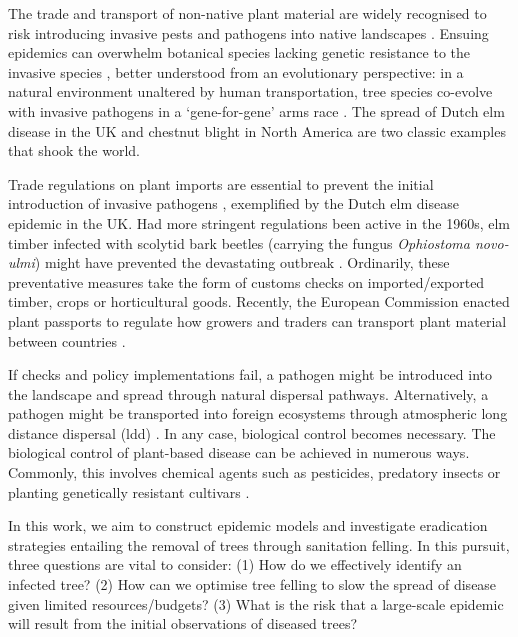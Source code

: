 The trade and transport of non-native plant material are widely recognised to risk introducing invasive pests and pathogens into native landscapes \cite{POTTER201761, lovett2016nonnative, roy2014increasing}.
Ensuing epidemics can overwhelm botanical species lacking genetic resistance to the invasive species \cite{desprez2016evolutionary}, better understood from an evolutionary perspective: in a natural environment unaltered by human transportation, tree species co-evolve with invasive pathogens in a `gene-for-gene' arms race \cite{Thrall1735, dangl2001plant, flor1971current}.
The spread of Dutch elm disease in the UK \cite{doi:10.1111/j.1365-3059.2010.02391.x} and chestnut blight
in North America \cite{doi:10.1002/9780470535486.ch7} are two classic examples that shook the world.

Trade regulations on plant imports are essential to prevent the initial introduction of invasive pathogens \cite{rodoni2009role}, exemplified by the Dutch elm disease epidemic in the UK. 
Had more stringent regulations been active in the 1960s, elm timber infected with scolytid bark beetles (carrying the fungus \textit{Ophiostoma novo‐ulmi}) might have prevented the devastating outbreak \cite{doi:10.1111/j.1365-3059.2010.02391.x}. 
Ordinarily, these preventative measures take the form of customs checks on imported/exported timber, crops or horticultural goods. 
Recently, the European Commission enacted plant passports to regulate how growers and traders can transport plant material between countries \cite{wulfert2010implementation}.

If checks and policy implementations fail, a pathogen might be introduced into the landscape and spread through natural
dispersal pathways. Alternatively, a pathogen might be transported into foreign ecosystems through atmospheric 
long distance dispersal (\acrshort{ldd}) \cite{brown2002aerial}. In any case, biological control becomes necessary. 
The biological control of plant-based disease
can be achieved in numerous ways. Commonly, this involves chemical agents such as pesticides, predatory insects or planting
genetically resistant cultivars \cite{pal2006biological, baker1974biological}. 

In this work, we aim to construct epidemic models and investigate eradication strategies
entailing the removal of trees through sanitation felling. 
In this pursuit, three questions are vital to consider: 
(1) How do we effectively identify an infected tree? 
(2) How can we optimise tree felling to slow the spread of disease given limited resources/budgets?
(3) What is the risk that a large-scale epidemic will result from the initial observations of diseased trees?

